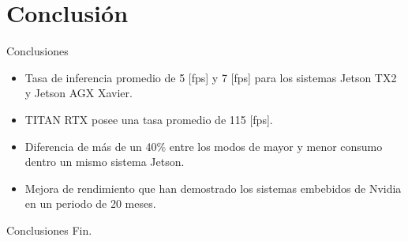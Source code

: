 \section{Conclusión}

\begin{frame}{Conclusiones}
\begin{itemize}
    \item  Tasa de inferencia promedio de  5 [fps] y 7 [fps] para los sistemas Jetson TX2 y Jetson AGX Xavier.
    \item  TITAN RTX posee una tasa promedio de 115 [fps]. 

    \item Diferencia de más de un 40\%  entre los modos de mayor y menor consumo dentro un mismo sistema Jetson.
    \item Mejora de rendimiento que han demostrado los sistemas embebidos de Nvidia en un periodo de 20 meses. 
\end{itemize}


\end{frame}


\begin{frame}{Conclusiones}
\centering
Fin.
\end{frame}

